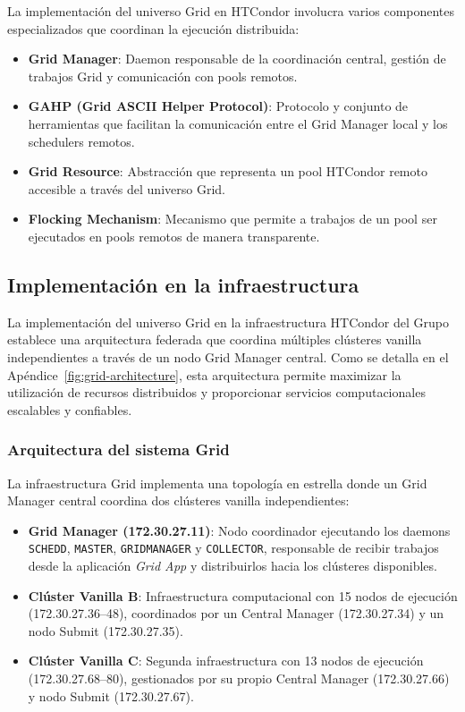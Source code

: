 La implementación del universo Grid en HTCondor involucra varios componentes especializados que coordinan la ejecución distribuida:

\begin{itemize}
	\item \textbf{Grid Manager}: Daemon responsable de la coordinación central, gestión de trabajos Grid y comunicación con pools remotos.
	
	\item \textbf{GAHP (Grid ASCII Helper Protocol)}: Protocolo y conjunto de herramientas que facilitan la comunicación entre el Grid Manager local y los schedulers remotos.
	
	\item \textbf{Grid Resource}: Abstracción que representa un pool HTCondor remoto accesible a través del universo Grid.
	
	\item \textbf{Flocking Mechanism}: Mecanismo que permite a trabajos de un pool ser ejecutados en pools remotos de manera transparente.
\end{itemize}

\subsection{Implementación en la infraestructura \GRID}
\noindent

La implementación del universo Grid en la infraestructura HTCondor del Grupo \GRID establece una arquitectura federada que coordina múltiples clústeres vanilla independientes a través de un nodo Grid Manager central. Como se detalla en el Apéndice~\ref{fig:grid-architecture}, esta arquitectura permite maximizar la utilización de recursos distribuidos y proporcionar servicios computacionales escalables y confiables.

\subsubsection{Arquitectura del sistema Grid}
\noindent

La infraestructura Grid implementa una topología en estrella donde un Grid Manager central coordina dos clústeres vanilla independientes:

\begin{itemize}
	\item \textbf{Grid Manager (172.30.27.11)}: Nodo coordinador ejecutando los daemons \texttt{SCHEDD}, \texttt{MASTER}, \texttt{GRIDMANAGER} y \texttt{COLLECTOR}, responsable de recibir trabajos desde la aplicación \textit{Grid App} y distribuirlos hacia los clústeres disponibles.
	
	\item \textbf{Clúster Vanilla B}: Infraestructura computacional con 15 nodos de ejecución (172.30.27.36--48), coordinados por un Central Manager (172.30.27.34) y un nodo Submit (172.30.27.35).
	
	\item \textbf{Clúster Vanilla C}: Segunda infraestructura con 13 nodos de ejecución (172.30.27.68--80), gestionados por su propio Central Manager (172.30.27.66) y nodo Submit (172.30.27.67).
\end{itemize}

